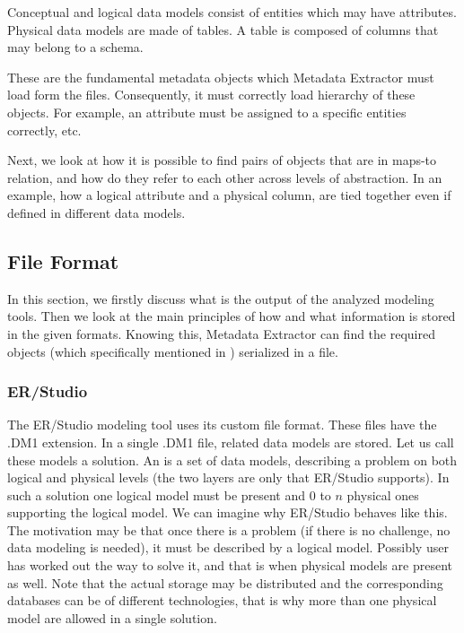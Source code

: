 \label{main_modeled_objects}
Conceptual and logical data models consist of entities which may have attributes.
Physical data models are made of tables. A table is composed of columns that may belong to a schema.

These are the fundamental metadata objects which Metadata Extractor must load form the files. 
Consequently, it must correctly load hierarchy of these objects. For example, an attribute must be assigned to a specific entities correctly, etc.

Next, we look at how it is possible to find pairs of objects that are in maps-to relation, and how do they refer to each other across levels of abstraction.
In an example, how a logical attribute and a physical column, are tied together even if defined in different data models.

\subsection{File Format}

In this section, we firstly discuss what is the output of the analyzed modeling tools. Then we look at the main principles of how and what information is stored in the given formats. Knowing this, Metadata Extractor can find the required objects (which specifically mentioned in ) serialized in a file.

\subsubsection{ER/Studio}
\label{subsec:dm1_format}

The ER/Studio modeling tool uses its custom file format. These files have the .DM1 extension. 
In a single .DM1 file, related data models are stored. Let us call these models a solution. An  is a set of data models, describing a problem on both logical and physical levels (the two layers are only that ER/Studio supports). 
In such a solution one logical model must be present and $0$ to $n$ physical ones supporting the logical model.
We can imagine why ER/Studio behaves like this. The motivation may be that once there is a problem (if there is no challenge, no data modeling is needed), it must be described by a logical model. 
Possibly user has worked out the way to solve it, and that is when physical models are present as well.
Note that the actual storage may be distributed and the corresponding databases can be of different technologies, that is why more than one physical model are allowed in a single solution.

